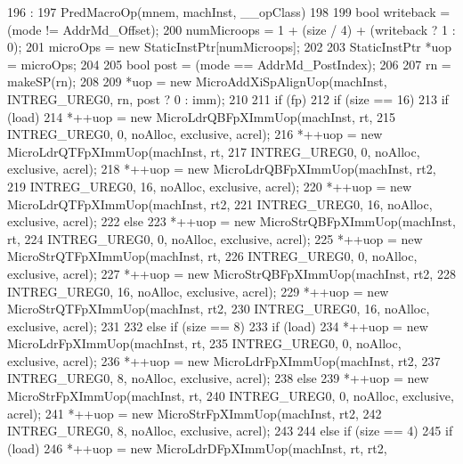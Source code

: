\begin{DoxyCode}
196                                                                       :
197     PredMacroOp(mnem, machInst, __opClass)
198 {
199     bool writeback = (mode != AddrMd_Offset);
200     numMicroops = 1 + (size / 4) + (writeback ? 1 : 0);
201     microOps = new StaticInstPtr[numMicroops];
202 
203     StaticInstPtr *uop = microOps;
204 
205     bool post = (mode == AddrMd_PostIndex);
206 
207     rn = makeSP(rn);
208 
209     *uop = new MicroAddXiSpAlignUop(machInst, INTREG_UREG0, rn, post ? 0 : imm);
210 
211     if (fp) {
212         if (size == 16) {
213             if (load) {
214                 *++uop = new MicroLdrQBFpXImmUop(machInst, rt,
215                         INTREG_UREG0, 0, noAlloc, exclusive, acrel);
216                 *++uop = new MicroLdrQTFpXImmUop(machInst, rt,
217                         INTREG_UREG0, 0, noAlloc, exclusive, acrel);
218                 *++uop = new MicroLdrQBFpXImmUop(machInst, rt2,
219                         INTREG_UREG0, 16, noAlloc, exclusive, acrel);
220                 *++uop = new MicroLdrQTFpXImmUop(machInst, rt2,
221                         INTREG_UREG0, 16, noAlloc, exclusive, acrel);
222             } else {
223                 *++uop = new MicroStrQBFpXImmUop(machInst, rt,
224                         INTREG_UREG0, 0, noAlloc, exclusive, acrel);
225                 *++uop = new MicroStrQTFpXImmUop(machInst, rt,
226                         INTREG_UREG0, 0, noAlloc, exclusive, acrel);
227                 *++uop = new MicroStrQBFpXImmUop(machInst, rt2,
228                         INTREG_UREG0, 16, noAlloc, exclusive, acrel);
229                 *++uop = new MicroStrQTFpXImmUop(machInst, rt2,
230                         INTREG_UREG0, 16, noAlloc, exclusive, acrel);
231             }
232         } else if (size == 8) {
233             if (load) {
234                 *++uop = new MicroLdrFpXImmUop(machInst, rt,
235                         INTREG_UREG0, 0, noAlloc, exclusive, acrel);
236                 *++uop = new MicroLdrFpXImmUop(machInst, rt2,
237                         INTREG_UREG0, 8, noAlloc, exclusive, acrel);
238             } else {
239                 *++uop = new MicroStrFpXImmUop(machInst, rt,
240                         INTREG_UREG0, 0, noAlloc, exclusive, acrel);
241                 *++uop = new MicroStrFpXImmUop(machInst, rt2,
242                         INTREG_UREG0, 8, noAlloc, exclusive, acrel);
243             }
244         } else if (size == 4) {
245             if (load) {
246                 *++uop = new MicroLdrDFpXImmUop(machInst, rt, rt2,
}}}}
\end{DoxyCode}
